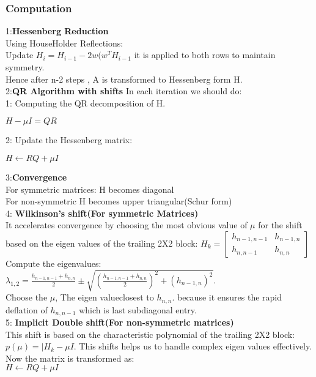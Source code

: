 \documentclass[a4paper,12pt]{article}
\begin{document}
 \subsubsection{Computation}
 1:\textbf{Hessenberg Reduction}\\
 Using HouseHolder Reflections:\\
 Update $H_i=H_{i-1}-2w(w^TH_{i-1}$ it is applied to both rows to maintain symmetry.\\
 Hence after n-2 steps , A is transformed to Hessenberg form H.\\
 2:\textbf{QR Algorithm with shifts}
 In each iteration we should do:\\
 1: Computing the QR decomposition of H.
 \begin{center}
     $H-\mu{I}=QR$
 \end{center}
 2: Update the Hessenberg matrix:\\
 \begin{center}
     $H \leftarrow RQ + \mu I$
 \end{center}
 3:\textbf{Convergence}\\ For symmetric matrices: H becomes diagonal\\
 For non-symmetric H becomes upper triangular(Schur form)\\
 4: \textbf{Wilkinson's shift(For symmetric Matrices)}\\
 It accelerates convergence by choosing the most obvious value of $\mu$ for the shift based on the eigen values of the trailing 2X2 block:
$H_k = 
\begin{bmatrix}
h_{n-1,n-1} & h_{n-1,n} \\
h_{n,n-1} & h_{n,n}
\end{bmatrix}$\\
Compute the eigenvalues:\\
$\lambda_{1,2}=\frac{h_{n-1,n-1}+h_{n,n}}{2}\pm \sqrt{({\frac{h_{n-1,n-1}+h_{n,n}}{2}})^2+({h_{n-1,n}})^2}$.\\
Choose the $\mu$, The eigen valueclosest to $h_{n,n}$. because it ensures the rapid deflation of $h_{n,n-1}$
which is last subdiagonal entry.\\
5: \textbf{Implicit Double shift(For non-symmetric matrices)}\\
This shift is based on the characteristic polynomial of the trailing 2X2 block:
$p(\mu)=|H_k-\mu I$.
This shifts helps us to handle complex eigen values effectively.\\
Now the matrix is transformed as: \\
$H \leftarrow RQ+\mu I$\\
\end{document}
